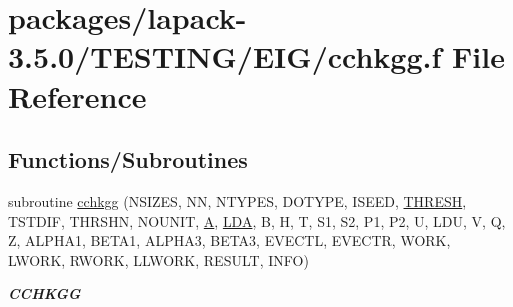 \hypertarget{cchkgg_8f}{}\section{packages/lapack-\/3.5.0/\+T\+E\+S\+T\+I\+N\+G/\+E\+I\+G/cchkgg.f File Reference}
\label{cchkgg_8f}
\subsection*{Functions/\+Subroutines}
\begin{DoxyCompactItemize}
\item 
subroutine \hyperlink{group__complex__eig_ga712d308fd40a2f0f279fe4a0c8544a30}{cchkgg} (N\+S\+I\+Z\+E\+S, N\+N, N\+T\+Y\+P\+E\+S, D\+O\+T\+Y\+P\+E, I\+S\+E\+E\+D, \hyperlink{zlaqgs_8c_a0656018abfc9fa2821827415f5d5ea57}{T\+H\+R\+E\+S\+H}, T\+S\+T\+D\+I\+F, T\+H\+R\+S\+H\+N, N\+O\+U\+N\+I\+T, \hyperlink{classA}{A}, \hyperlink{example__user_8c_ae946da542ce0db94dced19b2ecefd1aa}{L\+D\+A}, B, H, T, S1, S2, P1, P2, U, L\+D\+U, V, Q, Z, A\+L\+P\+H\+A1, B\+E\+T\+A1, A\+L\+P\+H\+A3, B\+E\+T\+A3, E\+V\+E\+C\+T\+L, E\+V\+E\+C\+T\+R, W\+O\+R\+K, L\+W\+O\+R\+K, R\+W\+O\+R\+K, L\+L\+W\+O\+R\+K, R\+E\+S\+U\+L\+T, I\+N\+F\+O)
\begin{DoxyCompactList}\small\item\em {\bfseries C\+C\+H\+K\+G\+G} \end{DoxyCompactList}\end{DoxyCompactItemize}
